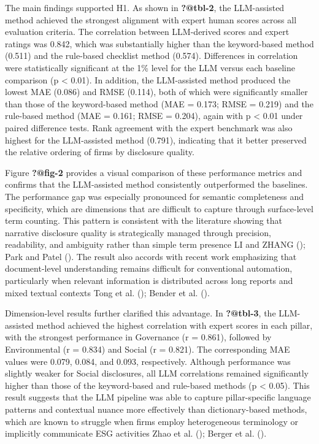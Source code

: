 \documentclass[
  12pt,
]{article}
\begin{document}
The main findings supported H1. As shown in \textbf{?@tbl-2}, the
LLM-assisted method achieved the strongest alignment with expert human
scores across all evaluation criteria. The correlation between
LLM-derived scores and expert ratings was 0.842, which was substantially
higher than the keyword-based method (0.511) and the rule-based
checklist method (0.574). Differences in correlation were statistically
significant at the 1\% level for the LLM versus each baseline comparison
(p \textless{} 0.01). In addition, the LLM-assisted method produced the
lowest MAE (0.086) and RMSE (0.114), both of which were significantly
smaller than those of the keyword-based method (MAE = 0.173; RMSE =
0.219) and the rule-based method (MAE = 0.161; RMSE = 0.204), again with
p \textless{} 0.01 under paired difference tests. Rank agreement with
the expert benchmark was also highest for the LLM-assisted method
(0.791), indicating that it better preserved the relative ordering of
firms by disclosure quality.

Figure \textbf{?@fig-2} provides a visual comparison of these
performance metrics and confirms that the LLM-assisted method
consistently outperformed the baselines. The performance gap was
especially pronounced for semantic completeness and specificity, which
are dimensions that are difficult to capture through surface-level term
counting. This pattern is consistent with the literature showing that
narrative disclosure quality is strategically managed through precision,
readability, and ambiguity rather than simple term presence LI and ZHANG
(); Park and Patel
(). The result also accords with recent
work emphasizing that document-level understanding remains difficult for
conventional automation, particularly when relevant information is
distributed across long reports and mixed textual contexts Tong et al.
(); Bender et al.
().

Dimension-level results further clarified this advantage. In
\textbf{?@tbl-3}, the LLM-assisted method achieved the highest
correlation with expert scores in each pillar, with the strongest
performance in Governance (r = 0.861), followed by Environmental (r =
0.834) and Social (r = 0.821). The corresponding MAE values were 0.079,
0.084, and 0.093, respectively. Although performance was slightly weaker
for Social disclosures, all LLM correlations remained significantly
higher than those of the keyword-based and rule-based methods (p
\textless{} 0.05). This result suggests that the LLM pipeline was able
to capture pillar-specific language patterns and contextual nuance more
effectively than dictionary-based methods, which are known to struggle
when firms employ heterogeneous terminology or implicitly communicate
ESG activities Zhao et al. (); Berger et
al. ().
\end{document}
